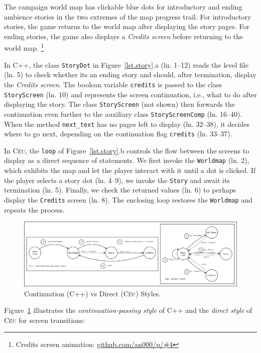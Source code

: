 \documentclass{vgtc}                          %
\newcommand{\CEU}{\textsc{C\'{e}u}\xspace}
\newcommand{\code}[1] {{\small{\texttt{#1}}}}
\begin{document}
The campaign world map has clickable blue dots for introductory and ending
ambience stories in the two extremes of the map progress trail.
For introductory stories, the game returns to the world map after displaying 
the story pages.
For ending stories, the game also displays a \emph{Credits screen} before
returning to the world map.%
\footnote{Credits screen animation: \url{github.com/an000/p/#4} }

In C++, the class \code{StoryDot} in Figure~\ref{lst.story}.a (ln. 1--12) reads
the level file (ln. 5) to check whether its an ending story and should, after
termination, display the \emph{Credits screen}.
%
The boolean variable \code{credits} is passed to the class
\code{StoryScreen} (ln. 10) and represents the screen continuation, i.e., what
to do after displaying the story.
The class \code{StoryScreen} (not shown) then forwards the continuation even
further to the auxiliary class \code{StoryScreenComp} (ln. 16--40).
%
When the method \code{next\_text} has no pages left to display (ln. 32--38),
it decides where to go next, depending on the continuation flag
\code{credits} (ln. 33--37).

In \CEU, the \code{loop} of Figure~\ref{lst.story}.b controls the flow between
the screens to display as a direct sequence of statements.
%
We first invoke the \code{Worldmap} (ln. 2), which exhibits the map and let
the player interact with it until a dot is clicked.
If the player selects a story dot (ln. 4--9), we invoke the \code{Story}
and await its termination (ln. 5).
Finally, we check the returned values (ln. 6) to perhaps display the
\code{Credits} screen (ln. 8).
The enclosing loop restores the \code{Worldmap} and repeats the process.

\begin{figure}[t]
\centering
\includegraphics[width=\textwidth]{continuation}
\caption{ Continuation (C++) vs Direct (\CEU) Styles.
\label{fig.story}
}
\end{figure}

Figure~\ref{fig.story} illustrates the \emph{continuation-passing style} of
C++ and the \emph{direct style} of \CEU for screen transitions:
\end{document}

